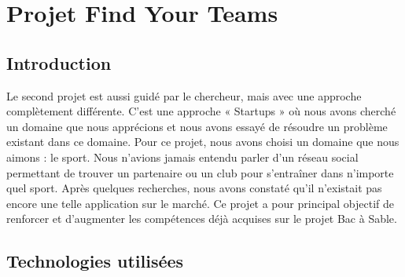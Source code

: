 \chapter{Projet Find Your Teams}

\section{Introduction}

Le second projet est aussi guidé par le chercheur, mais avec une approche complètement différente.
C’est une approche « Startups » où nous avons cherché un domaine que nous apprécions et nous avons essayé de résoudre un problème existant dans ce domaine.
Pour ce projet, nous avons choisi un domaine que nous aimons : le sport.
Nous n'avions jamais entendu parler d'un réseau social permettant de trouver un partenaire ou un club pour s'entraîner dans n'importe quel sport.
Après quelques recherches, nous avons constaté qu'il n'existait pas encore une telle application sur le marché.
Ce projet a pour principal objectif de renforcer et d'augmenter les compétences déjà acquises sur le projet Bac à Sable.

\section{Technologies utilisées}


